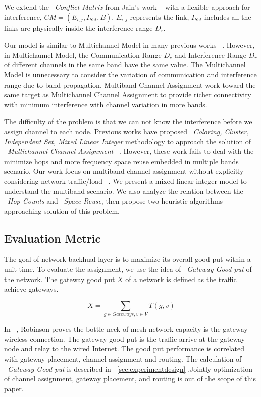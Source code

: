 We extend the ~\emph{Conflict Matrix} from Jain's work ~\cite{tang2005interference} with a flexible approach for interference,
 $CM=(E_{i,j},I_{Set},B)$. $E_{i,j}$ represents the link, $I_{Set}$ includes all the links are physically inside the interference range $D_r$. 

Our model is similar to Multichannel Model in many previous works ~\cite{tang2005interference,yuan2006cross,si2010overview}. However, in Multichannel Model, the Communication Range $D_c$ and Interference Range $D_r$ of different channels in the same band have the same value. The Multichannel Model is unnecessary to consider the variation of communication and interference range due to band propagation.
Multiband Channel Assignment work toward the same target as Multichannel Channel Assignment to provide richer connectivity with minimum interference with channel variation in more bands.

The difficulty of the problem is that we can not know the interference before we assign channel to each node. Previous works have proposed ~\emph{Coloring, Cluster, Independent Set, Mixed Linear Integer} methodology to approach the solution of ~\emph{Multichannel Channel Assignment} ~\cite{mishra2005weighted,peng2012efficient,tang2005interference}. 
However, these work fails to deal with the minimize hops and more frequency space reuse embedded in multiple bands scenario.
Our work focus on multiband channel assignment 
without explicitly considering network traffic/load ~\cite{marina2010topology}.
We present a mixed linear integer model to understand the multiband scenario. We also analyze the relation between the ~\emph{Hop Counts} and ~\emph{Space Reuse}, then propose two heuristic algorithms approaching solution of this problem.




\subsection{Evaluation Metric}
\label{subsec:metric}

The goal of network  backhual layer is to maximize its overall good put within a unit time. 
To evaluate the assignment, we use the idea of ~\emph{Gateway Good put} of the network. The gateway good put $X$ of a network is defined as the traffic achieve gateways.

\begin{equation}
\label{eq:goodput}
X=\sum_{g \in Gateways, v \in V}T(g,v)
\end{equation}

In ~\cite{robinson2008adding}, Robinson proves the bottle neck of mesh network capacity is the gateway wireless connection. 
The gateway good put is the traffic arrive at the gateway node and relay to the wired Internet. The good put performance is correlated with gateway placement, channel assignment and routing. 
The calculation of ~\emph{Gateway Good put} is described in ~\ref{sec:experimentdesign} .Jointly optimization of channel assignment, gateway placement, and routing is out of the scope of this paper.


